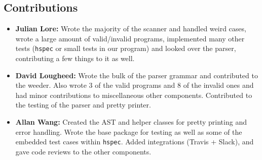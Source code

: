 \documentclass[11pt]{article}
\begin{document}
\subsection{Contributions}
\label{sec:org32e390e}
\begin{itemize}
\item \textbf{Julian Lore:} Wrote the majority of the scanner and handled weird
cases, wrote a large amount of valid/invalid programs, implemented
many other tests (\texttt{hspec} or small tests in our program) and looked
over the parser, contributing a few things to it as well.
\item \textbf{David Lougheed:} Wrote the bulk of the parser grammar and contributed to
the weeder. Also wrote 3 of the valid programs and 8 of the
invalid ones and had minor contributions to miscellaneous other components.
Contributed to the testing of the parser and pretty printer.
\item \textbf{Allan Wang:} Created the AST and helper classes for pretty printing
and error handling.  Wrote the base package for testing as well as
some of the embedded test cases within \texttt{hspec}.  Added integrations
(Travis + Slack), and gave code reviews to the other components.
\end{itemize}
\end{document}
